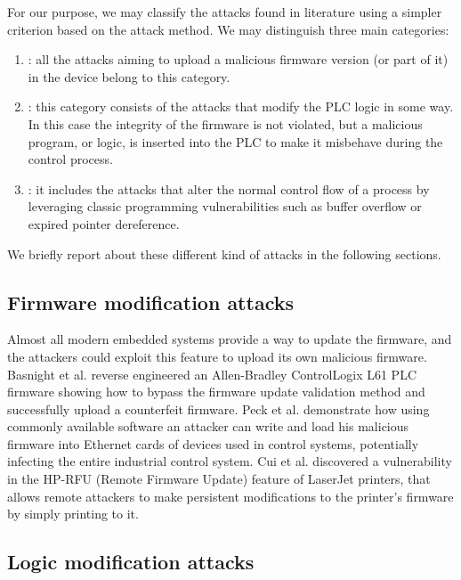 For our purpose, we may classify the attacks found in literature using a simpler criterion based on the attack method. We may distinguish three main categories:
\begin{enumerate}
	\item {}: all the attacks aiming to upload a malicious firmware version (or part of it) in the device belong to this category.
	\item {}: this category consists of the attacks that modify the PLC logic in some way. In this case the integrity of the firmware is not violated,
		but a malicious program, or logic, is inserted into the PLC to make it misbehave during the control process.
	\item {}: it includes the attacks that alter the normal control flow of a process by leveraging classic programming vulnerabilities
		such as buffer overflow or expired pointer dereference.
\end{enumerate}

We briefly report about these different kind of attacks in the following sections.


\subsection{Firmware modification attacks}

Almost all modern embedded systems provide a way to update the firmware, and the attackers could exploit this feature to upload its own malicious firmware.
Basnight et al. \cite{firmware-mod} reverse engineered an Allen-Bradley ControlLogix L61 PLC firmware showing how to bypass the
firmware update validation method and successfully upload a counterfeit firmware.
Peck et al. \cite{ethernet-vuln} demonstrate how using commonly available software an attacker can write and load his malicious firmware into Ethernet cards of devices
used in control systems, potentially infecting the entire industrial control system.
Cui et al. \cite{print-vuln} discovered a vulnerability in the HP-RFU (Remote Firmware Update) feature of LaserJet printers,
that allows remote attackers to make persistent modifications to the printer's firmware by simply printing to it.


\subsection{Logic modification attacks}

